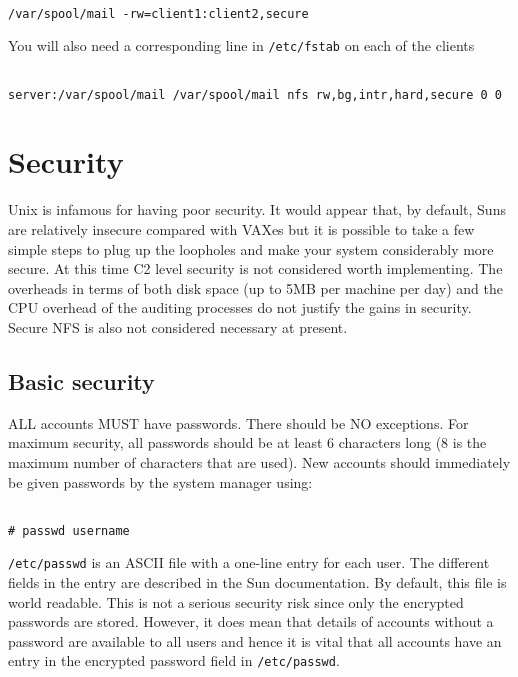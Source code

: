 \begin{verbatim}

/var/spool/mail -rw=client1:client2,secure

\end{verbatim}

You will also need a corresponding line in {\tt /etc/fstab} on each of the
clients

\begin{verbatim}

server:/var/spool/mail /var/spool/mail nfs rw,bg,intr,hard,secure 0 0 

\end{verbatim}

\section{Security}

Unix is infamous for having poor security. It would appear that, by
default, Suns are relatively insecure compared with VAXes but it is possible to 
take a few simple steps to plug up the loopholes and make your system
considerably more secure. At this time C2 level security is not considered
worth implementing. The overheads in terms of both disk space (up to 5MB per
machine per day) and the CPU overhead of the auditing processes do not justify
the gains in security. Secure NFS is also not considered necessary at present.

\subsection{Basic security}

ALL accounts MUST have passwords. There should be NO exceptions. 
For maximum security, all passwords should be at least 6 characters long 
(8 is the maximum number of characters that are used).
New accounts should immediately be given passwords by the system 
manager using: 

\begin{verbatim}

# passwd username

\end{verbatim}

{\tt /etc/passwd} is an ASCII file with a one-line entry for 
each user. The different fields in the entry are described in the 
Sun documentation. By default, this file is world readable. This is not 
a serious security risk since only the encrypted passwords are stored. However,
it does mean that details of accounts without a password are available to all
users and hence it is vital that all accounts have an entry in the encrypted
password field in {\tt /etc/passwd}. 

